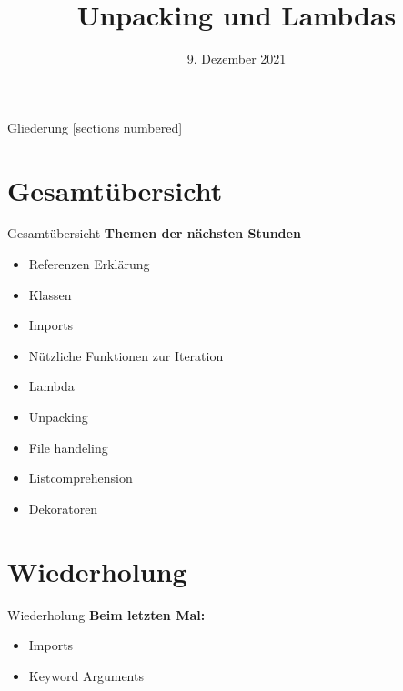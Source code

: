 



\title{Unpacking und Lambdas}
\date{9. Dezember 2021}


	
\maketitle

\begin{frame}{Gliederung}
	[sections numbered]
	\tableofcontents
\end{frame}

\section*{Gesamtübersicht}
\begin{frame}{Gesamtübersicht}
	\textbf{Themen der nächsten Stunden}
	\begin{itemize}
		\item Referenzen Erklärung
		\item  Klassen
		\item Imports
		\item Nützliche Funktionen zur Iteration
		\item \alert{Lambda}
		\item \alert{Unpacking}
		\item File handeling
		\item Listcomprehension
		\item Dekoratoren
	\end{itemize}
\end{frame}

\section{Wiederholung}
\begin{frame}{Wiederholung}
	\textbf{Beim letzten Mal:}
	\begin{itemize}
		\item Imports
		
		
		\item Keyword Arguments
		
	\end{itemize}	
\end{frame}

